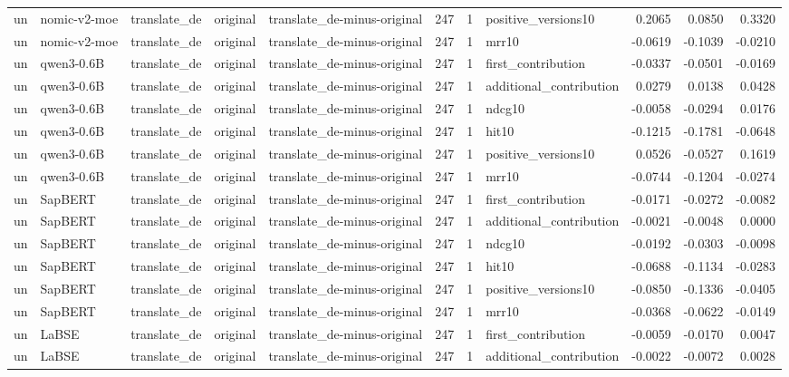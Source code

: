 \begin{tabular}{lllllrrlrrr}
un & nomic-v2-moe & translate\_de & original & translate\_de-minus-original & 247 & 1 & positive\_versions10 & 0.2065 & 0.0850 & 0.3320 \\
un & nomic-v2-moe & translate\_de & original & translate\_de-minus-original & 247 & 1 & mrr10 & -0.0619 & -0.1039 & -0.0210 \\
un & qwen3-0.6B & translate\_de & original & translate\_de-minus-original & 247 & 1 & first\_contribution & -0.0337 & -0.0501 & -0.0169 \\
un & qwen3-0.6B & translate\_de & original & translate\_de-minus-original & 247 & 1 & additional\_contribution & 0.0279 & 0.0138 & 0.0428 \\
un & qwen3-0.6B & translate\_de & original & translate\_de-minus-original & 247 & 1 & ndcg10 & -0.0058 & -0.0294 & 0.0176 \\
un & qwen3-0.6B & translate\_de & original & translate\_de-minus-original & 247 & 1 & hit10 & -0.1215 & -0.1781 & -0.0648 \\
un & qwen3-0.6B & translate\_de & original & translate\_de-minus-original & 247 & 1 & positive\_versions10 & 0.0526 & -0.0527 & 0.1619 \\
un & qwen3-0.6B & translate\_de & original & translate\_de-minus-original & 247 & 1 & mrr10 & -0.0744 & -0.1204 & -0.0274 \\
un & SapBERT & translate\_de & original & translate\_de-minus-original & 247 & 1 & first\_contribution & -0.0171 & -0.0272 & -0.0082 \\
un & SapBERT & translate\_de & original & translate\_de-minus-original & 247 & 1 & additional\_contribution & -0.0021 & -0.0048 & 0.0000 \\
un & SapBERT & translate\_de & original & translate\_de-minus-original & 247 & 1 & ndcg10 & -0.0192 & -0.0303 & -0.0098 \\
un & SapBERT & translate\_de & original & translate\_de-minus-original & 247 & 1 & hit10 & -0.0688 & -0.1134 & -0.0283 \\
un & SapBERT & translate\_de & original & translate\_de-minus-original & 247 & 1 & positive\_versions10 & -0.0850 & -0.1336 & -0.0405 \\
un & SapBERT & translate\_de & original & translate\_de-minus-original & 247 & 1 & mrr10 & -0.0368 & -0.0622 & -0.0149 \\
un & LaBSE & translate\_de & original & translate\_de-minus-original & 247 & 1 & first\_contribution & -0.0059 & -0.0170 & 0.0047 \\
un & LaBSE & translate\_de & original & translate\_de-minus-original & 247 & 1 & additional\_contribution & -0.0022 & -0.0072 & 0.0028 \\

\end{tabular}
